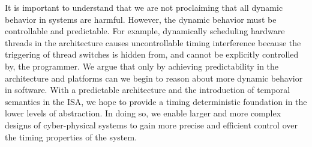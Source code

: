 It is important to understand that we are not proclaiming that all dynamic behavior in systems are harmful.
However, the dynamic behavior must be controllable and predictable. 
For example, dynamically scheduling hardware threads in the architecture causes uncontrollable timing interference because the triggering of thread switches is hidden from, and cannot be explicitly controlled by, the programmer.
We argue that only by achieving predictability in the architecture and platforms can we begin to reason about more dynamic behavior in software.
With a predictable architecture and the introduction of temporal semantics in the ISA, we hope to provide a timing deterministic foundation in the lower levels of abstraction.
In doing so, we enable larger and more complex designs of cyber-physical systems to gain more precise and efficient control over the timing properties of the system.  

